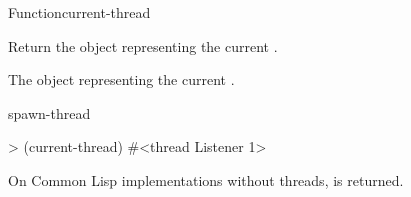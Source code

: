 \begin{functiondoc}{Function}{current-thread}{\noargs{} 
    \returns{} }
%

\fnsyntax

\fnpurpose Return the object representing the current .

\fnpackage {}

\fnmodule {}

\fnreturns The object representing the current . 

\begin{alsos}{spawn-thread}
\end{alsos}

\fnexample
\begin{example}
> (current-thread)
#<thread Listener 1>
\end{example}

\fnnote On Common Lisp implementations without threads,
 is returned.

\end{functiondoc}


